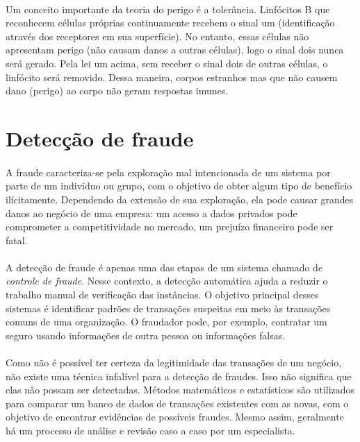 \documentclass{iiufrgs}
\begin{document}
\paragraph{}Um conceito importante da teoria do perigo é a tolerância. Linfócitos B que reconhecem células próprias continuamente recebem o sinal um (identificação através dos receptores em sua superfície). No entanto, essas células não apresentam perigo (não causam danos a outras células), logo o sinal dois nunca será gerado. Pela lei um acima, sem receber o sinal dois de outras células, o linfócito será removido. Dessa maneira, corpos estranhos mas que não causem dano (perigo) ao corpo não geram respostas imunes.

\newpage

\section{Detecção de fraude}

\paragraph{}A fraude caracteriza-se pela exploração mal intencionada de um sistema por parte de um indivíduo ou grupo, com o objetivo de obter algum tipo de benefício ilícitamente. Dependendo da extensão de sua exploração, ela pode causar grandes danos ao negócio de uma empresa: um acesso a dados privados pode comprometer a competitividade no mercado, um prejuízo financeiro pode ser fatal.

\paragraph{}A detecção de fraude é apenas uma das etapas de um sistema chamado de \emph{controle de fraude}. Nesse contexto, a detecção automática ajuda a reduzir o trabalho manual de verificação das instâncias. O objetivo principal desses sistemas é identificar padrões de transações suspeitas em meio às transações comuns de uma organização. O fraudador pode, por exemplo, contratar um seguro usando informações de outra pessoa ou informações falsas.

\paragraph{}Como não é possível ter certeza da legitimidade das transações de um negócio, não existe uma técnica infalível para a detecção de fraudes. Isso não significa que elas não possam ser detectadas. Métodos matemáticos e estatísticos são utilizados para comparar um banco de dados de transações existentes com as novas, com o objetivo de encontrar evidências de possíveis fraudes. Mesmo assim, geralmente há um processo de análise e revisão caso a caso por um especialista.
\end{document}

